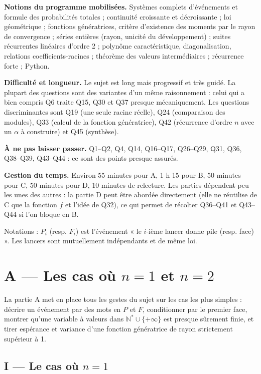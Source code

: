 \documentclass[11pt,a4paper]{article}
\begin{document}
\textbf{Notions du programme mobilisées.} Systèmes complets d'événements et formule des probabilités totales ; continuité croissante et décroissante ; loi géométrique ; fonctions génératrices, critère d'existence des moments par le rayon de convergence ; séries entières (rayon, unicité du développement) ; suites récurrentes linéaires d'ordre 2 ; polynôme caractéristique, diagonalisation, relations coefficients-racines ; théorème des valeurs intermédiaires ; récurrence forte ; Python.

\textbf{Difficulté et longueur.} Le sujet est long mais progressif et très guidé. La plupart des questions sont des variantes d'un même raisonnement : celui qui a bien compris Q6 traite Q15, Q30 et Q37 presque mécaniquement. Les questions discriminantes sont Q19 (une seule racine réelle), Q24 (comparaison des modules), Q33 (calcul de la fonction génératrice), Q42 (récurrence d'ordre \(n\) avec un \(\alpha\) à construire) et Q45 (synthèse).

\textbf{À ne pas laisser passer.} Q1--Q2, Q4, Q14, Q16--Q17, Q26--Q29, Q31, Q36, Q38--Q39, Q43--Q44 : ce sont des points presque assurés.

\textbf{Gestion du temps.} Environ 55 minutes pour A, 1 h 15 pour B, 50 minutes pour C, 50 minutes pour D, 10 minutes de relecture. Les parties dépendent peu les unes des autres : la partie D peut être abordée directement (elle ne réutilise de C que la fonction \(f\) et l'idée de Q32), ce qui permet de récolter Q36--Q41 et Q43--Q44 si l'on bloque en B.

Notations : \(P_i\) (resp. \(F_i\)) est l'événement « le \(i\)-ième lancer donne pile (resp. face) ». Les lancers sont mutuellement indépendants et de même loi.

\hypertarget{a-les-cas-ouxf9-n1-et-n2}{%
\section{\texorpdfstring{A --- Les cas où \(n=1\) et \(n=2\)}{A --- Les cas où n=1 et n=2}}\label{a-les-cas-ouxf9-n1-et-n2}}

La partie A met en place tous les gestes du sujet sur les cas les plus simples : décrire un événement par des mots en \(P\) et \(F\), conditionner par le premier face, montrer qu'une variable à valeurs dans \({\mathbb{N}}^*\cup\{+\infty\}\) est presque sûrement finie, et tirer espérance et variance d'une fonction génératrice de rayon strictement supérieur à 1.

\hypertarget{i-le-cas-ouxf9-n1}{%
\subsection{\texorpdfstring{I --- Le cas où \(n=1\)}{I --- Le cas où n=1}}\label{i-le-cas-ouxf9-n1}}
\end{document}
